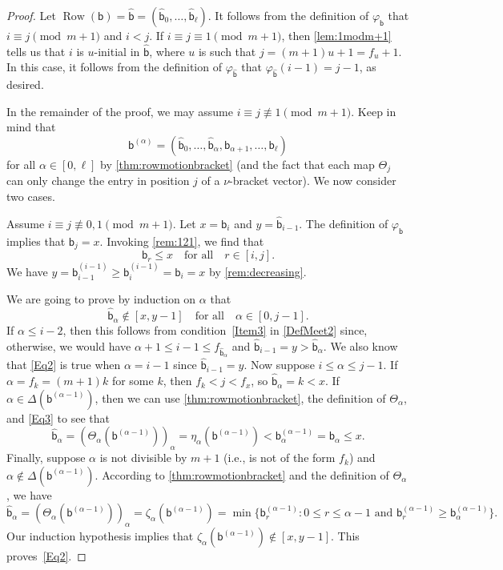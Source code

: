 \documentclass[11pt]{amsart}
\theoremstyle{definition}
\DeclareMathOperator{\row}{Row}
\begin{document}
\begin{proof}
Let $\row(\mathsf b)=\widehat{\mathsf b}=(\widehat{\mathsf b}_0,\ldots,\widehat{\mathsf b}_\ell)$. It follows from the definition of $\varphi_{\mathsf b}$ that $i\equiv j\pmod{m+1}$ and $i<j$. If $i\equiv j\equiv 1\pmod{m+1}$, then \cref{lem:1modm+1} tells us that $i$ is $u$-initial in $\widehat{\mathsf b}$, where $u$ is such that $j=(m+1)u+1=f_u+1$. In this case, it follows from the definition of $\varphi_{\widehat{\mathsf b}}$ that $\varphi_{\widehat{\mathsf b}}(i-1)=j-1$, as desired. 

In the remainder of the proof, we may assume $i\equiv j\not\equiv 1\pmod{m+1}$. Keep in mind that \[\mathsf b^{(\alpha)}=(\widehat{\mathsf b}_0,\ldots,\widehat{\mathsf b}_\alpha,\mathsf b_{\alpha+1},\ldots,\mathsf b_\ell)\] for all $\alpha\in[0,\ell]$ by \cref{thm:rowmotionbracket} (and the fact that each map $\Theta_j$ can only change the entry in position $j$ of a $\nu$-bracket vector). We now consider two cases. 

\medskip

 Assume $i\equiv j\not\equiv 0,1\pmod{m+1}$. Let $x=\mathsf b_i$ and $y=\widehat{\mathsf b}_{i-1}$. The definition of $\varphi_{\mathsf b}$ implies that $\mathsf b_j=x$. Invoking \cref{rem:121}, we find that 
\begin{equation}\label{Eq3}
\mathsf b_r\leq x\quad\text{for all}\quad r\in[i,j].
\end{equation}
We have $y=\mathsf b^{(i-1)}_{i-1}\geq \mathsf b^{(i-1)}_{i}=\mathsf b_i=x$ by \cref{rem:decreasing}. 

We are going to prove by induction on $\alpha$ that 
\begin{equation}\label{Eq2}
    \widehat{\mathsf b}_\alpha\not\in[x,y-1]\quad \text{for all}\quad \alpha\in[0,j-1].
\end{equation} If $\alpha\leq i-2$, then this follows from condition~\eqref{Item3} in \cref{DefMeet2} since, otherwise, we would have $\alpha+1\leq i-1\leq f_{\widehat{\mathsf b}_\alpha}$ and $\widehat{\mathsf b}_{i-1}=y>\widehat{\mathsf b}_\alpha$. We also know that \eqref{Eq2} is true when $\alpha=i-1$ since $\widehat{\mathsf b}_{i-1}=y$. Now suppose $i\leq \alpha\leq j-1$. If $\alpha=f_k=(m+1)k$ for some $k$, then $f_k<j<f_x$, so $\widehat{\mathsf b}_\alpha=k<x$. If $\alpha\in\Delta(\mathsf b^{(\alpha-1)})$, then we can use \cref{thm:rowmotionbracket}, the definition of $\Theta_\alpha$, and \eqref{Eq3} to see that \[\widehat{\mathsf b}_\alpha=(\Theta_\alpha(\mathsf b^{(\alpha-1)}))_\alpha=\eta_\alpha(\mathsf b^{(\alpha-1)})<\mathsf b_\alpha^{(\alpha-1)}=\mathsf b_\alpha\leq x.\] Finally, suppose $\alpha$ is not divisible by $m+1$ (i.e., is not of the form $f_k$) and $\alpha\not\in\Delta(\mathsf b^{(\alpha-1)})$. According to \cref{thm:rowmotionbracket} and the definition of $\Theta_\alpha$, we have \[\widehat{\mathsf b}_\alpha=(\Theta_\alpha(\mathsf b^{(\alpha-1)}))_\alpha=\zeta_\alpha(\mathsf b^{(\alpha-1)})=\min\{\mathsf b_r^{(\alpha-1)}:0\leq r\leq \alpha-1\text{ and }\mathsf b_r^{(\alpha-1)}\geq \mathsf b_\alpha^{(\alpha-1)}\}.\] Our induction hypothesis implies that $\zeta_\alpha(\mathsf b^{(\alpha-1)})\not\in[x,y-1]$. This proves~\eqref{Eq2}.  


\end{proof}
\end{document}
